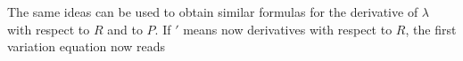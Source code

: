 \documentclass[a4paper]{article}
\numberwithin{equation}{section}
\begin{document}
%
%
%
%
%
%
%


The same ideas can be used to obtain similar formulas for the derivative of $\lambda$ with respect to $R$ and to $P$. If $'$ means now derivatives with respect to $R$, the first variation equation now reads
\end{document}
